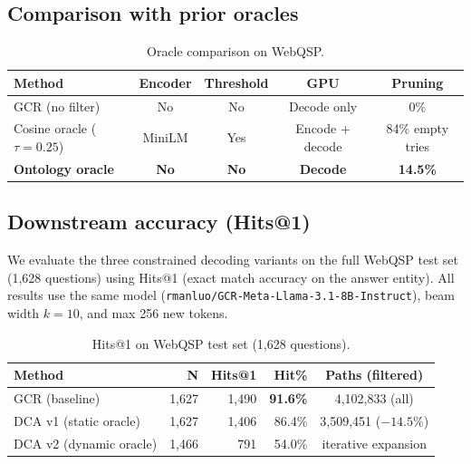 \documentclass[11pt,twoside]{article}
\begin{document}
\subsection{Comparison with prior oracles}

\begin{table}[H]
	\centering
	\caption{Oracle comparison on WebQSP.}
	\label{tab:oracle-comparison}
	\begin{tabular}{lcccc}
		\toprule
		\textbf{Method}              & \textbf{Encoder} & \textbf{Threshold} & \textbf{GPU}     & \textbf{Pruning}     \\
		\midrule
		GCR (no filter)              & No               & No                 & Decode only      & 0\%                  \\
		Cosine oracle (\(\tau=0.25\)) & MiniLM           & Yes                & Encode + decode  & 84\% empty tries     \\
		\textbf{Ontology oracle}     & \textbf{No}      & \textbf{No}        & \textbf{Decode}  & \textbf{14.5\%}      \\
		\bottomrule
	\end{tabular}
\end{table}

\subsection{Downstream accuracy (Hits@1)}

We evaluate the three constrained decoding variants on the full WebQSP test set (1,628 questions) using Hits@1 (exact match accuracy on the answer entity). All results use the same model (\texttt{rmanluo/GCR-Meta-Llama-3.1-8B-Instruct}), beam width $k=10$, and max 256 new tokens.

\begin{table}[H]
	\centering
	\caption{Hits@1 on WebQSP test set (1,628 questions).}
	\label{tab:hits1}
	\begin{tabular}{lrrrc}
		\toprule
		\textbf{Method}           & \textbf{N} & \textbf{Hits@1} & \textbf{Hit\%} & \textbf{Paths (filtered)} \\
		\midrule
		GCR (baseline)            & 1,627     & 1,490           & \textbf{91.6\%} & 4,102,833 (all)           \\
		DCA v1 (static oracle)    & 1,627     & 1,406           & 86.4\%          & 3,509,451 ($-14.5\%$)     \\
		DCA v2 (dynamic oracle)   & 1,466     & 791             & 54.0\%          & iterative expansion       \\
		\bottomrule
	\end{tabular}
\end{table}
\end{document}
